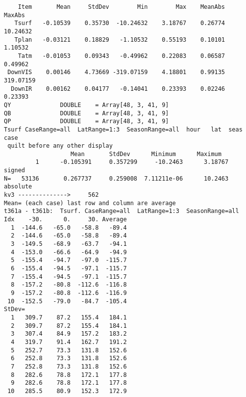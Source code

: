 \documentclass{article}
\begin{document}
\begin{verbatim}
    Item       Mean     StdDev        Min        Max    MeanAbs     MaxAbs
   Tsurf   -0.10539    0.35730  -10.24632    3.18767    0.26774   10.24632
   Tplan   -0.03121    0.18829   -1.10532    0.55193    0.10101    1.10532
    Tatm   -0.01053    0.09343   -0.49962    0.22083    0.06587    0.49962
 DownVIS    0.00146    4.73669 -319.07159    4.18801    0.99135  319.07159
  DownIR    0.00162    0.04177   -0.14041    0.23393    0.02246    0.23393
QY              DOUBLE    = Array[48, 3, 41, 9]
QB              DOUBLE    = Array[48, 3, 41, 9]
QP              DOUBLE    = Array[48, 3, 41, 9]
Tsurf CaseRange=all  LatRange=1:3  SeasonRange=all  hour   lat  seas  case
 quilt before any other display
                   Mean       StdDev      Minimum      Maximum
         1      -0.105391     0.357299     -10.2463      3.18767  signed
N=   53136       0.267737     0.259008  7.11211e-06      10.2463  absolute
kv3 -------------->     562
Mean= (each case) last row and column are average
t361a - t361b:  Tsurf. CaseRange=all  LatRange=1:3  SeasonRange=all
Idx    -30.      0.     30. Average
  1  -144.6   -65.0   -58.8   -89.4
  2  -144.6   -65.0   -58.8   -89.4
  3  -149.5   -68.9   -63.7   -94.1
  4  -153.0   -66.6   -64.9   -94.9
  5  -155.4   -94.7   -97.0  -115.7
  6  -155.4   -94.5   -97.1  -115.7
  7  -155.4   -94.5   -97.1  -115.7
  8  -157.2   -80.8  -112.6  -116.8
  9  -157.2   -80.8  -112.6  -116.9
 10  -152.5   -79.0   -84.7  -105.4
StDev=
  1   309.7    87.2   155.4   184.1
  2   309.7    87.2   155.4   184.1
  3   307.4    84.9   157.2   183.2
  4   319.7    91.4   162.7   191.2
  5   252.7    73.3   131.8   152.6
  6   252.8    73.3   131.8   152.6
  7   252.8    73.3   131.8   152.6
  8   282.6    78.8   172.1   177.8
  9   282.6    78.8   172.1   177.8
 10   285.5    80.9   152.3   172.9
\end{verbatim} 
 
\end{document}
